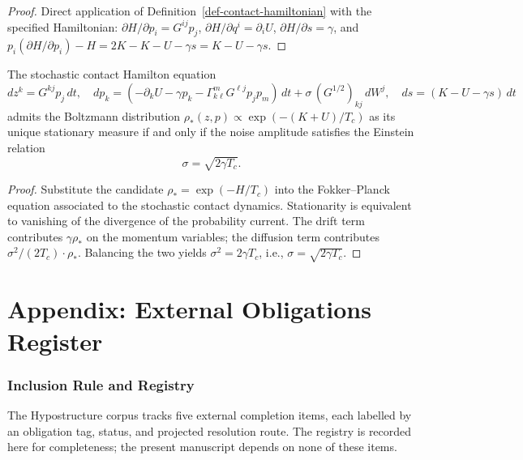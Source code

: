 \begin{proof}
Direct application of Definition~\ref{def-contact-hamiltonian} with the specified Hamiltonian: $\partial H/\partial p_i = G^{ij} p_j$, $\partial H/\partial q^i = \partial_i U$, $\partial H/\partial s = \gamma$, and $p_i (\partial H/\partial p_i) - H = 2K - K - U - \gamma s = K - U - \gamma s$.
\end{proof}

\begin{theorem}\label{thm-fluctuation-dissipation}
The stochastic contact Hamilton equation
\[
dz^k = G^{kj} p_j\, dt,
\quad
dp_k = (-\partial_k U - \gamma p_k - \Gamma^m_{k\ell} G^{\ell j} p_j p_m)\, dt + \sigma\, (G^{1/2})_{kj}\, dW^j,
\quad
ds = (K - U - \gamma s)\, dt
\]
admits the Boltzmann distribution $\rho_*(z,p) \propto \exp(-(K + U)/T_c)$ as its unique stationary measure if and only if the noise amplitude satisfies the Einstein relation
\[
\sigma = \sqrt{2 \gamma T_c}.
\]
\end{theorem}

\begin{proof}
Substitute the candidate $\rho_* = \exp(-H/T_c)$ into the Fokker--Planck equation associated to the stochastic contact dynamics. Stationarity is equivalent to vanishing of the divergence of the probability current. The drift term contributes $\gamma\rho_*$ on the momentum variables; the diffusion term contributes $\sigma^2/(2 T_c) \cdot \rho_*$. Balancing the two yields $\sigma^2 = 2\gamma T_c$, i.e., $\sigma = \sqrt{2\gamma T_c}$.
\end{proof}

\part{Appendix: External Obligations Register}

\section{Inclusion Rule and Registry}

The Hypostructure corpus tracks five external completion items, each labelled by an obligation tag, status, and projected resolution route. The registry is recorded here for completeness; the present manuscript depends on none of these items.

